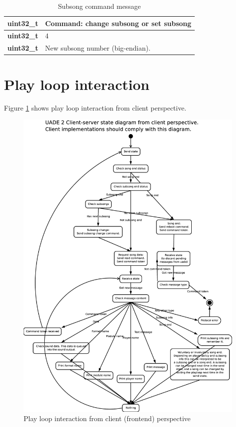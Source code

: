 \documentclass{article}
\begin{document}
\begin{table}
\begin{center}
\caption{Subsong command message}
\label{tab:command_subsong}
\begin{tabular}{|r|l|}
\hline
\textbf{uint32\_t} & Command: change subsong or set subsong\\
\hline
\textbf{uint32\_t} & 4\\
\hline
\textbf{uint32\_t} & New subsong number (big-endian).\\
\hline
\end{tabular}
\end{center}
\end{table}



\section{Play loop interaction}

Figure \ref{fig:playloop} shows play loop interaction from client
perspective.

\begin{figure}
\centering
\includegraphics[scale=0.25]{play_loop_state_diagram.eps}
\caption{Play loop interaction from client (frontend) perspective}
\label{fig:playloop}
\end{figure}
\end{document}
